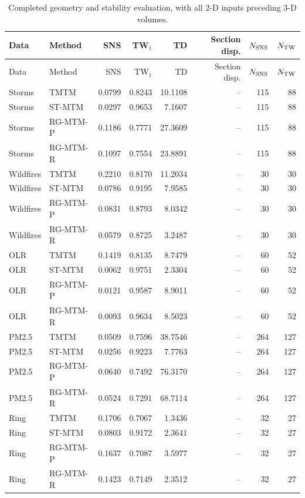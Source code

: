 \begingroup\small\setlength{\tabcolsep}{4pt}
\begin{longtable}{llrrrrrr}
\caption{Completed geometry and stability evaluation, with all 2-D inputs preceding 3-D volumes.}\label{tab:standard_geometry}\\\toprule
Data & Method & SNS & TW$_1$ & TD & Section disp. & $N_{\rm SNS}$ & $N_{\rm TW}$\\\midrule\endfirsthead
\toprule Data & Method & SNS & TW$_1$ & TD & Section disp. & $N_{\rm SNS}$ & $N_{\rm TW}$\\\midrule\endhead
\bottomrule\endfoot
Storms & TMTM & 0.0799 & 0.8243 & 10.1108 & -- & 115 & 88\\
Storms & ST-MTM & 0.0297 & 0.9653 & 7.1607 & -- & 115 & 88\\
Storms & RG-MTM-P & 0.1186 & 0.7771 & 27.3609 & -- & 115 & 88\\
Storms & RG-MTM-R & 0.1097 & 0.7554 & 23.8891 & -- & 115 & 88\\
Wildfires & TMTM & 0.2210 & 0.8170 & 11.2034 & -- & 30 & 30\\
Wildfires & ST-MTM & 0.0786 & 0.9195 & 7.9585 & -- & 30 & 30\\
Wildfires & RG-MTM-P & 0.0831 & 0.8793 & 8.0342 & -- & 30 & 30\\
Wildfires & RG-MTM-R & 0.0579 & 0.8725 & 3.2487 & -- & 30 & 30\\
OLR & TMTM & 0.1419 & 0.8135 & 8.7479 & -- & 60 & 52\\
OLR & ST-MTM & 0.0062 & 0.9751 & 2.3304 & -- & 60 & 52\\
OLR & RG-MTM-P & 0.0121 & 0.9587 & 8.9011 & -- & 60 & 52\\
OLR & RG-MTM-R & 0.0093 & 0.9634 & 8.5023 & -- & 60 & 52\\
PM2.5 & TMTM & 0.0509 & 0.7596 & 38.7546 & -- & 264 & 127\\
PM2.5 & ST-MTM & 0.0256 & 0.9223 & 7.7763 & -- & 264 & 127\\
PM2.5 & RG-MTM-P & 0.0640 & 0.7492 & 76.3170 & -- & 264 & 127\\
PM2.5 & RG-MTM-R & 0.0524 & 0.7291 & 68.7114 & -- & 264 & 127\\
Ring & TMTM & 0.1706 & 0.7067 & 1.3436 & -- & 32 & 27\\
Ring & ST-MTM & 0.0803 & 0.9172 & 2.3641 & -- & 32 & 27\\
Ring & RG-MTM-P & 0.1637 & 0.7087 & 3.5977 & -- & 32 & 27\\
Ring & RG-MTM-R & 0.1423 & 0.7149 & 2.3512 & -- & 32 & 27\\

\end{longtable}
